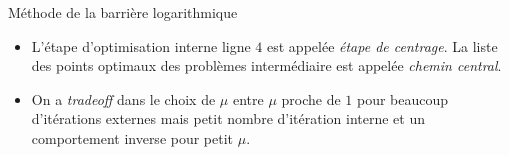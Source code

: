 \documentclass[aspectratio = 169]{beamer}
\begin{document}
\begin{frame}{Méthode de la barrière logarithmique}
  \begin{itemize}
  \item<1-> L'étape d'optimisation interne ligne $4$ est appelée
    \emph{étape de centrage}. La liste des points optimaux des
    problèmes intermédiaire est appelée \emph{chemin central}.
  \item<2-> On a \textit{tradeoff} dans le choix de $\mu$ entre $\mu$
    proche de $1$ pour beaucoup d'itérations externes mais petit
    nombre d'itération interne et un comportement inverse pour petit
    $\mu$.
  \end{itemize}
\end{frame}
\end{document}
